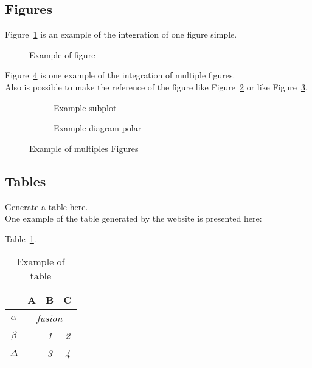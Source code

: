 \subsection{Figures}

Figure~\ref{figure_simple} is an example of the integration of one figure simple. \\

\begin{figure}[ht]
	\centering
	\def\svgwidth{1\columnwidth}
	\fontsize{10pt}{10pt}\selectfont
	\caption{Example of figure}
	\label{figure_simple}
\end{figure}


Figure~\ref{figure_multiple} is one example of the integration of multiple figures.\\ Also is possible to make the reference of the figure like Figure~\ref{figure_subplot} or like Figure~\ref{figure_polaire}.

\begin{figure}[ht]
	\centering
	\begin{subfigure}[b]{0.8\textwidth}
		\centering
		\def\svgwidth{\columnwidth}
		\fontsize{10pt}{10pt}\selectfont
		\caption{Example subplot} 
		\label{figure_subplot}
	\end{subfigure}
	\qquad
	\begin{subfigure}[b]{0.7\textwidth}
		\centering
		\def\svgwidth{\columnwidth}
		\fontsize{10pt}{10pt}\selectfont
		\caption{Example diagram polar } 
		\label{figure_polaire}
	\end{subfigure}
	\caption{Example of multiples Figures } 
	\label{figure_multiple}
\end{figure}



\FloatBarrier
\subsection{Tables}

Generate a table \href{http://www.tablesgenerator.com/latex_tables}{here}. \\

One example of the table generated by the website is presented here:

Table~\ref{tableau_exemple}.

\begin{table}[ht]
\centering
\begin{tabular}{c|c|c|c|}
\cline{2-4}
                               & \textbf{A}                 & \textbf{B} & \textbf{C} \\ \hline
\multicolumn{1}{|c|}{$\alpha$} & \multicolumn{3}{c|}{\textit{fusion}}                 \\ \hline
\multicolumn{1}{|c|}{$\beta$}  & \multirow{2}{*}{\textit{}} & \textit{1} & \textit{2} \\ \cline{1-1} \cline{3-4} 
\multicolumn{1}{|c|}{$\Delta$} &                            & \textit{3} & \textit{4} \\ \hline
\end{tabular}
\caption{Example of table}
\label{tableau_exemple}
\end{table}


